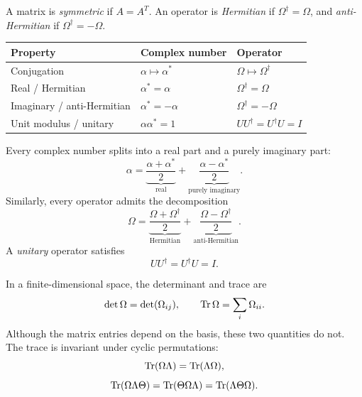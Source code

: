 A matrix is \emph{symmetric} if $A=A^T$. An operator is
\emph{Hermitian} if $\Omega^\dagger=\Omega$, and
\emph{anti-Hermitian} if $\Omega^\dagger=-\Omega$.

\begin{center}
\begin{tabular}{@{}lll@{}}
\toprule
Property & Complex number & Operator\\
\midrule
Conjugation & $\alpha\mapsto\alpha^*$ & $\Omega\mapsto\Omega^\dagger$\\
Real / Hermitian & $\alpha^*=\alpha$ & $\Omega^\dagger=\Omega$\\
Imaginary / anti-Hermitian & $\alpha^*=-\alpha$ & $\Omega^\dagger=-\Omega$\\
Unit modulus / unitary & $\alpha\alpha^*=1$ & $UU^\dagger=U^\dagger U=I$\\
\bottomrule
\end{tabular}
\end{center}
Every complex number splits into a real part and a purely imaginary part:
\[
 \alpha=\underbrace{\frac{\alpha+\alpha^*}{2}}_{\text{real}}
       +\underbrace{\frac{\alpha-\alpha^*}{2}}_{\text{purely imaginary}}.
\]
Similarly, every operator admits the decomposition
\[
 \Omega=
 \underbrace{\frac{\Omega+\Omega^\dagger}{2}}_{\text{Hermitian}}
 +\underbrace{\frac{\Omega-\Omega^\dagger}{2}}_{\text{anti-Hermitian}}.
\]
A \emph{unitary} operator satisfies
\[
 UU^\dagger=U^\dagger U=I.
\]

In a finite-dimensional space, the determinant and trace are
\[
 \det\Omega=\det(\Omega_{ij}),
 \qquad \operatorname{Tr}\Omega=\sum_i\Omega_{ii}.
\]
Although the matrix entries depend on the basis, these two quantities
do not. The trace is invariant under cyclic permutations:
\[
 \operatorname{Tr}(\Omega\Lambda)=\operatorname{Tr}(\Lambda\Omega),
\]
\[
 \operatorname{Tr}(\Omega\Lambda\Theta)
 =\operatorname{Tr}(\Theta\Omega\Lambda)
 =\operatorname{Tr}(\Lambda\Theta\Omega).
\]
